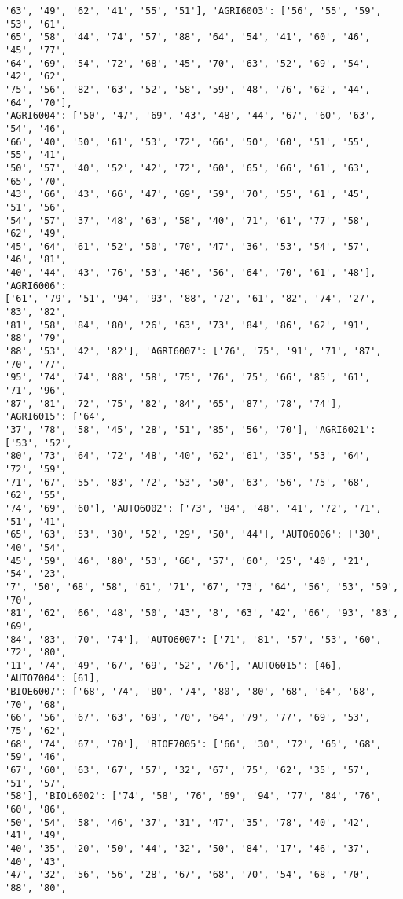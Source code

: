 \documentclass[11pt]{article}
\begin{document}
\begin{Verbatim}[commandchars=\\\{\}]
'63', '49', '62', '41', '55', '51'], 'AGRI6003': ['56', '55', '59', '53', '61',
'65', '58', '44', '74', '57', '88', '64', '54', '41', '60', '46', '45', '77',
'64', '69', '54', '72', '68', '45', '70', '63', '52', '69', '54', '42', '62',
'75', '56', '82', '63', '52', '58', '59', '48', '76', '62', '44', '64', '70'],
'AGRI6004': ['50', '47', '69', '43', '48', '44', '67', '60', '63', '54', '46',
'66', '40', '50', '61', '53', '72', '66', '50', '60', '51', '55', '55', '41',
'50', '57', '40', '52', '42', '72', '60', '65', '66', '61', '63', '65', '70',
'43', '66', '43', '66', '47', '69', '59', '70', '55', '61', '45', '51', '56',
'54', '57', '37', '48', '63', '58', '40', '71', '61', '77', '58', '62', '49',
'45', '64', '61', '52', '50', '70', '47', '36', '53', '54', '57', '46', '81',
'40', '44', '43', '76', '53', '46', '56', '64', '70', '61', '48'], 'AGRI6006':
['61', '79', '51', '94', '93', '88', '72', '61', '82', '74', '27', '83', '82',
'81', '58', '84', '80', '26', '63', '73', '84', '86', '62', '91', '88', '79',
'88', '53', '42', '82'], 'AGRI6007': ['76', '75', '91', '71', '87', '70', '77',
'95', '74', '74', '88', '58', '75', '76', '75', '66', '85', '61', '71', '96',
'87', '81', '72', '75', '82', '84', '65', '87', '78', '74'], 'AGRI6015': ['64',
'37', '78', '58', '45', '28', '51', '85', '56', '70'], 'AGRI6021': ['53', '52',
'80', '73', '64', '72', '48', '40', '62', '61', '35', '53', '64', '72', '59',
'71', '67', '55', '83', '72', '53', '50', '63', '56', '75', '68', '62', '55',
'74', '69', '60'], 'AUTO6002': ['73', '84', '48', '41', '72', '71', '51', '41',
'65', '63', '53', '30', '52', '29', '50', '44'], 'AUTO6006': ['30', '40', '54',
'45', '59', '46', '80', '53', '66', '57', '60', '25', '40', '21', '54', '23',
'7', '50', '68', '58', '61', '71', '67', '73', '64', '56', '53', '59', '70',
'81', '62', '66', '48', '50', '43', '8', '63', '42', '66', '93', '83', '69',
'84', '83', '70', '74'], 'AUTO6007': ['71', '81', '57', '53', '60', '72', '80',
'11', '74', '49', '67', '69', '52', '76'], 'AUTO6015': [46], 'AUTO7004': [61],
'BIOE6007': ['68', '74', '80', '74', '80', '80', '68', '64', '68', '70', '68',
'66', '56', '67', '63', '69', '70', '64', '79', '77', '69', '53', '75', '62',
'68', '74', '67', '70'], 'BIOE7005': ['66', '30', '72', '65', '68', '59', '46',
'67', '60', '63', '67', '57', '32', '67', '75', '62', '35', '57', '51', '57',
'58'], 'BIOL6002': ['74', '58', '76', '69', '94', '77', '84', '76', '60', '86',
'50', '54', '58', '46', '37', '31', '47', '35', '78', '40', '42', '41', '49',
'40', '35', '20', '50', '44', '32', '50', '84', '17', '46', '37', '40', '43',
'47', '32', '56', '56', '28', '67', '68', '70', '54', '68', '70', '88', '80',

\end{Verbatim}
\end{document}

